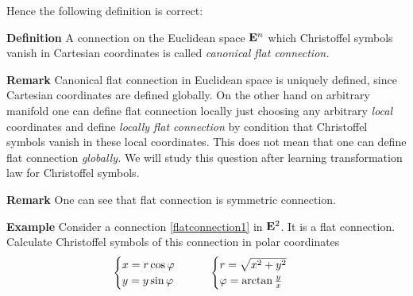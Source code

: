 \documentclass[12pt]{article}
\theoremstyle{theorem}
\numberwithin{equation}{section}
\begin{document}
Hence the following definition is correct:

\m


{\bf Definition}  A connection on the Euclidean space
${\bf E}^n$ which Christoffel symbols vanish in Cartesian coordinates
is called {\it canonical flat connection.}


{\bf Remark} {\small   Canonical flat connection in Euclidean space is uniquely defined,
since Cartesian coordinates
are defined globally.  On the other hand
on arbitrary manifold one can define flat connection locally just choosing any arbitrary {\it local}
coordinates and define {\it locally flat connection} by condition that Christoffel symbols
vanish in these local coordinates. This does not mean that one can define flat connection {\it globally.}
 We will study this question after learning transformation law for Christoffel symbols.}


\m
{\bf Remark}   One can see that flat connection is symmetric connection.


\m


  {\bf Example} Consider a connection \eqref{flatconnection1} in ${\bf E}^2$. It is a flat connection.
            Calculate Christoffel symbols of this connection in polar coordinates
                       \begin{equation}\label{polarcoordinates}
                        \begin{cases}
                        x=r\cos\varphi\cr
                        y=y\sin\varphi\cr
                        \end{cases}
                        \qquad
                        \begin{cases}
                        r=\sqrt {x^2+y^2}\cr
                        \varphi={\rm arctan\,} {y\over x}\cr
                           \end{cases}
                                \end{equation}
\end{document}
